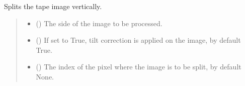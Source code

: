 \documentclass[letterpaper,10pt,english]{sphinxmanual}
\begin{document}
\begin{fulllineitems}
\begin{fulllineitems}
\label{\detokenize{forensicfit.core.tape:forensicfit.core.tape.Tape.__init__}}
\pysigstartsignatures
{}
\pysigstopsignatures
\end{fulllineitems}


\begin{fulllineitems}
\label{\detokenize{forensicfit.core.tape:forensicfit.core.tape.Tape.split_v}}
\pysigstartsignatures
{}
\pysigstopsignatures
\sphinxAtStartPar
Splits the tape image vertically.
\begin{quote}\begin{description}
\begin{itemize}
\item {} 
\sphinxAtStartPar
{} () \textendash{} The side of the image to be processed.

\item {} 
\sphinxAtStartPar
{} (\sphinxstyleliteralemphasis{\sphinxupquote{, }}) \textendash{} If set to True, tilt correction is applied on the image, by default True.

\item {} 
\sphinxAtStartPar
{} (\sphinxstyleliteralemphasis{\sphinxupquote{, }}) \textendash{} The index of the pixel where the image is to be split, by default None.


\end{itemize}
\end{description}
\end{quote}
\end{fulllineitems}
\end{fulllineitems}
\end{document}
